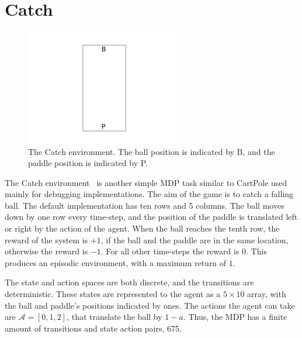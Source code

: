 
\section{Catch}\label{sec:catch}
\begin{figure}
	\label{fig:catch_env}
	\centering
	\includegraphics[width = 0.6\textwidth]{Figures/catch_env.png}
	\caption{The Catch environment. The ball position is indicated by B, and the paddle position is indicated by P.}
\end{figure}
The Catch environment~\cite{osband2020bsuite} is another simple MDP task similar to CartPole used mainly for debugging implementations. The aim of the game is to catch a falling ball. The default implementation has ten rows and 5 columns. The ball moves down by one row every time-step, and the position of the paddle is translated left or right by the action of the agent. When the ball reaches the tenth row, the reward of the system is $+1$, if the ball and the paddle are in the same location, otherwise the reward is $-1$. For all other time-steps the reward is 0. This produces an episodic environment, with a maximum return of $1$.

The state and action spaces are both discrete, and the transitions are deterministic. These states are represented to the agent as a $5\times 10$ array, with the ball and paddle's positions indicated by ones. The actions the agent can take are $\mathcal{A} = [0, 1, 2]$, that translate the ball by $1-a$. Thus, the MDP has a finite amount of transitions and state action pairs, 675.

